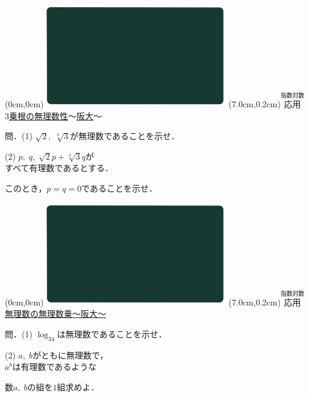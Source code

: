 \documentclass[10pt,
fleqn,
dvipdfmx,
uplatex
]{jsarticle}
\begin{document}
\bf\boldmath



\at(0cm,0cm){\includegraphics[width=8cm,bb=0 0 1920 1080]{./youtube/thumbnails/templates/smart_background/指数対数.jpeg}}
\at(7.0cm,0.2cm){\small\color{bradorange}$\overset{\text{指数対数}}{\text{応用}}$}
{\color{orange}\Large\underline{$3$乗根の無理数性$〜$阪大$〜$}}\vspace{0.3zw}

\normalsize 
問．(1)  $\sqrt 2,\;\sqrt[3]3$が無理数であることを示せ．

\LARGE
{\normalsize (2)} $p,\;q,\;\sqrt 2p+\sqrt[3]3q$が\\
\hfill すべて有理数であるとする．

\normalsize 
\vspace{0.4zw}
\hfill このとき，{\LARGE $p=q=0$}であることを示せ．



\newpage



\at(0cm,0cm){\includegraphics[width=8cm,bb=0 0 1920 1080]{./youtube/thumbnails/templates/smart_background/指数対数.jpeg}}
\at(7.0cm,0.2cm){\small\color{bradorange}$\overset{\text{指数対数}}{\text{応用}}$}
{\color{orange}\LARGE\underline{無理数の無理数乗〜阪大〜}}\vspace{0.3zw}

\normalsize 
問．(1)  $\log _34$は無理数であることを示せ．

\LARGE
{\normalsize (2)}  $a,\;b$がともに無理数で，\\
\hfill $a^b$は有理数であるような

\normalsize 
\vspace{0.4zw}
\hfill 数$a,\;b$の組を{\LARGE $1$組}求めよ．\\
\end{document}
